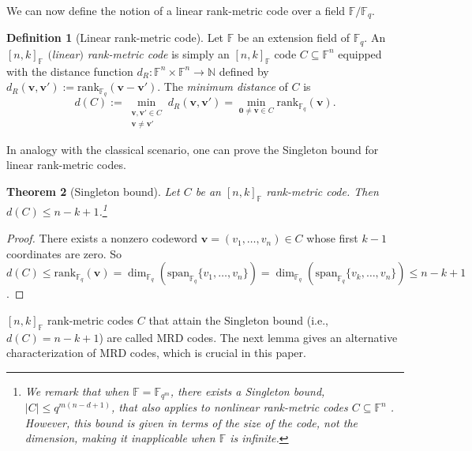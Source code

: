 \documentclass[11pt]{article}
\theoremstyle{plain}
\newtheorem{thm}{Theorem}[section]
\theoremstyle{definition}
\newtheorem{defn}[thm]{Definition}
\theoremstyle{remark}
\newcommand{\N}{\mathbb{N}}
\newcommand{\F}{\mathbb{F}}
\newcommand{\spa}{\mathrm{span}}
\newcommand{\bv}{\bm{v}}
\newcommand{\rank}{\mathrm{rank}}
\begin{document}


We can now define the notion of a linear rank-metric code over a field $\F/\F_q$.

\begin{defn}[Linear rank-metric code]
Let $\F$ be an extension field of $\F_q$.
An \emph{$[n,k]_{\F}$ $($linear$)$ rank-metric code} is simply an $[n,k]_{\F}$ code $C\subseteq \F^n$ equipped with the distance function $d_R: \F^n\times \F^n\to\N$ defined by $d_R(\bv,\bv'):=\rank_{\F_q}(\bv-\bv')$.
The \emph{minimum distance} of $C$ is 
\[
d(C):=\min_{\substack{\bv, \bv'\in C\\ \bv\neq \bv'}}d_R(\bv, \bv')=\min_{\mathbf{0}\neq \bv\in C} \rank_{\F_q}(\bv).
\]
\end{defn}

In analogy with the classical scenario, one can prove the Singleton bound for linear rank-metric codes.

\begin{thm}[Singleton bound]
Let $C$ be an $[n,k]_{\F}$ rank-metric code. Then $d(C)\leq n-k+1$.\footnote{We remark that when $\F=\F_{q^m}$, there exists a Singleton bound, $|C|\leq q^{m(n-d+1)}$, that also applies to nonlinear rank-metric codes $C\subseteq \F^n$ \cite{G85}. However, this bound is given in terms of the size of the code, not the dimension, making it inapplicable when $\F$ is infinite.}
\end{thm}
\begin{proof}
There exists a nonzero codeword $\bv=(v_1,\dots,v_n)\in C$ whose first $k-1$ coordinates are zero. So $d(C)\leq \rank_{\F_q}(\bv)=\dim_{\F_q}(\spa_{\F_q}\{v_1,\ldots,v_n\})=\dim_{\F_q}(\spa_{\F_q}\{v_k,\ldots,v_n\})\leq n-k+1$.
\end{proof}

$[n,k]_{\F}$ rank-metric codes $C$ that attain the Singleton bound (i.e., $d(C)=n-k+1$) are called MRD codes. The next lemma gives an alternative characterization of MRD codes, which is crucial in this paper. 
\end{document}
